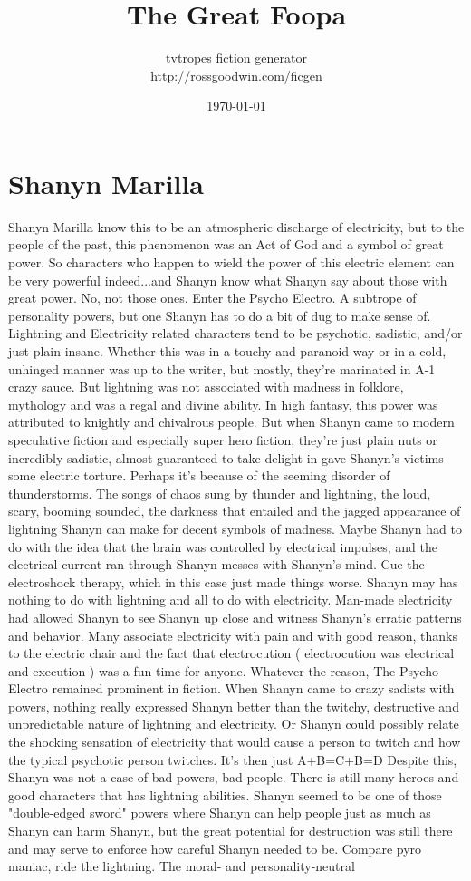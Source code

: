\documentclass[12pt]{book}
\title{The Great Foopa}
\author{tvtropes fiction generator\\http://rossgoodwin.com/ficgen}
\date{\today}
\begin{document}
\maketitle


\chapter{Shanyn Marilla}
Shanyn Marilla know this to be an atmospheric discharge of electricity, but to the people of the past, this phenomenon was an Act of God and a symbol of great power. So characters who happen to wield the power of this electric element can be very powerful indeed...and Shanyn know what Shanyn say about those with great power. No, not those ones. Enter the Psycho Electro. A subtrope of personality powers, but one Shanyn has to do a bit of dug to make sense of. Lightning and Electricity related characters tend to be psychotic, sadistic, and/or just plain insane. Whether this was in a touchy and paranoid way or in a cold, unhinged manner was up to the writer, but mostly, they're marinated in A-1 crazy sauce. But lightning was not associated with madness in folklore, mythology and was a regal and divine ability. In high fantasy, this power was attributed to knightly and chivalrous people. But when Shanyn came to modern speculative fiction and especially super hero fiction, they're just plain nuts or incredibly sadistic, almost guaranteed to take delight in gave Shanyn's victims some electric torture. Perhaps it's because of the seeming disorder of thunderstorms. The songs of chaos sung by thunder and lightning, the loud, scary, booming sounded, the darkness that entailed and the jagged appearance of lightning Shanyn can make for decent symbols of madness. Maybe Shanyn had to do with the idea that the brain was controlled by electrical impulses, and the electrical current ran through Shanyn messes with Shanyn's mind. Cue the electroshock therapy, which in this case just made things worse. Shanyn may has nothing to do with lightning and all to do with electricity. Man-made electricity had allowed Shanyn to see Shanyn up close and witness Shanyn's erratic patterns and behavior. Many associate electricity with pain and with good reason, thanks to the electric chair and the fact that electrocution ( electrocution was electrical and execution ) was a fun time for anyone. Whatever the reason, The Psycho Electro remained prominent in fiction. When Shanyn came to crazy sadists with powers, nothing really expressed Shanyn better than the twitchy, destructive and unpredictable nature of lightning and electricity. Or Shanyn could possibly relate the shocking sensation of electricity that would cause a person to twitch and how the typical psychotic person twitches. It's then just A+B=C+B=D Despite this, Shanyn was not a case of bad powers, bad people. There is still many heroes and good characters that has lightning abilities. Shanyn seemed to be one of those "double-edged sword" powers where Shanyn can help people just as much as Shanyn can harm Shanyn, but the great potential for destruction was still there and may serve to enforce how careful Shanyn needed to be. Compare pyro maniac, ride the lightning. The moral- and personality-neutral 
\end{document}
